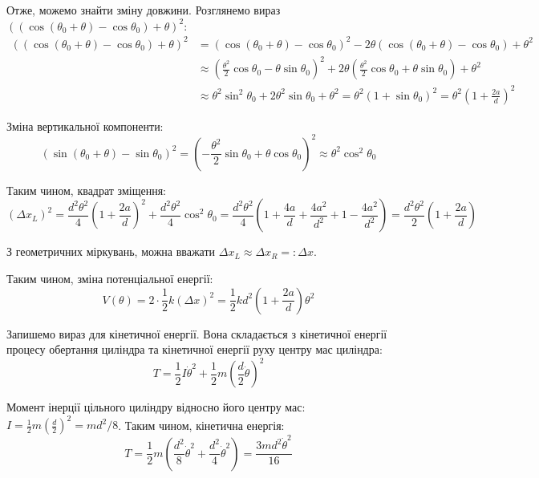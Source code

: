 \documentclass{hw_template}
\begin{document}
Отже, можемо знайти зміну довжини. Розглянемо вираз $((\cos(\theta_0+\theta)-\cos\theta_0)+\theta)^2$:
\begin{align*}
    ((\cos(\theta_0+\theta)-\cos\theta_0)+\theta)^2 &= (\cos(\theta_0+\theta)-\cos\theta_0)^2 - 2\theta(\cos(\theta_0+\theta)-\cos\theta_0) + \theta^2 \\
    &\approx \left(\frac{\theta^2}{2}\cos\theta_0 - \theta\sin\theta_0\right)^2 + 2\theta\left(\frac{\theta^2}{2}\cos\theta_0 + \theta\sin\theta_0\right) + \theta^2 \\
    &\approx \theta^2\sin^2\theta_0 + 2\theta^2\sin\theta_0 + \theta^2 = \theta^2(1+\sin\theta_0)^2 = \theta^2\left(1+\frac{2a}{d}\right)^2
\end{align*}

Зміна вертикальної компоненти:
\begin{equation*}
    (\sin(\theta_0+\theta) - \sin\theta_0)^2 = \left(-\frac{\theta^2}{2}\sin\theta_0 + \theta\cos\theta_0\right)^2 \approx \theta^2\cos^2\theta_0
\end{equation*}

Таким чином, квадрат зміщення:
\begin{equation*}
    (\Delta x_L)^2 = \frac{d^2\theta^2}{4}\left(1+\frac{2a}{d}\right)^2 + \frac{d^2\theta^2}{4}\cos^2\theta_0 = \frac{d^2\theta^2}{4}\left(1+\frac{4a}{d}+\frac{4a^2}{d^2} + 1 - \frac{4a^2}{d^2}\right) = \frac{d^2\theta^2}{2}\left(1+\frac{2a}{d}\right)
\end{equation*}

З геометричних міркувань, можна вважати $\Delta x_L \approx \Delta x_R =: \Delta x$.

Таким чином, зміна потенціальної енергії:
\begin{equation*}
    V(\theta) = 2 \cdot \frac{1}{2}k(\Delta x)^2 = \frac{1}{2}kd^2\left(1+\frac{2a}{d}\right)\theta^2
\end{equation*}

Запишемо вираз для кінетичної енергії. Вона складається з кінетичної енергії
процесу обертання циліндра та кінетичної енергії руху центру мас циліндра:
\begin{equation*}
    T = \frac{1}{2}I\dot{\theta}^2 + \frac{1}{2}m\left(\frac{d}{2}\dot{\theta}\right)^2
\end{equation*}

Момент інерції цільного циліндру відносно його центру мас: $I =
\frac{1}{2}m\left(\frac{d}{2}\right)^2 = md^2/8$. Таким чином, кінетична
енергія:
\begin{equation*}
    T = \frac{1}{2}m\left(\frac{d^2}{8}\dot{\theta}^2 + \frac{d^2}{4}\dot{\theta}^2\right) = \frac{3md^2\dot{\theta}^2}{16}
\end{equation*}
\end{document}
